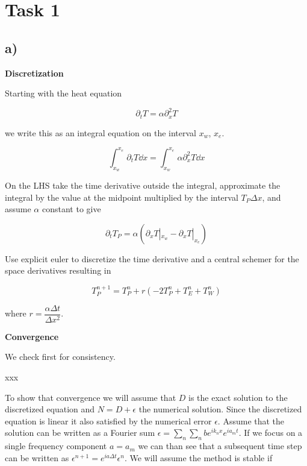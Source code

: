\documentclass{article}
\begin{document}
\section{Task 1}

\subsection*{a)}

\textbf{Discretization}

Starting with the heat equation

\begin{equation}
	\partial_t T = \alpha \partial_x^2 T
\end{equation}

we write this as an integral equation on the interval $x_w$, $x_e$.

\begin{equation}
	\int_{x_w}^{x_e}  \partial_t T \dd{x} = \int_{x_w}^{x_e}  \alpha \partial_x^2 T \dd{x}
\end{equation}

On the LHS take the time derivative outside the integral, approximate the integral by the value at the midpoint multiplied by the interval $T_P \Delta x$, and assume $\alpha$ constant to give

\begin{equation}
 	\partial_t T_P = \alpha (\partial_x T |_{x_w} - \partial_x T |_{x_e})
\end{equation}

Use explicit euler to discretize the time derivative and a central schemer for the space derivatives resulting in

\begin{equation}
 	T_P^{n+1} = T_P^n + r ( -2T_P^n + T_E^n + T_W^n)
\end{equation}

where $r = \dfrac{\alpha \Delta t }{\Delta x^2} $.


\textbf{Convergence}

We check first for consistency.

xxx

To show that convergence we will assume that $D$ is the exact solution to the discretized equation and $N = D+\epsilon$ the numerical solution. Since the discretized equation is linear it also satisfied by the numerical error $\epsilon$. Assume that the solution can be written as a Fourier sum $\epsilon = \sum_n\sum_n b e^{ik_nx}e^{ia_mt}$. If we focus on a single frequency component $a = a_m$  we can than see that a subsequent time step can be written as $\epsilon^{n+1}=e^{ia\Delta t}\epsilon^n$. We will assume the method is stable if 
\end{document}
